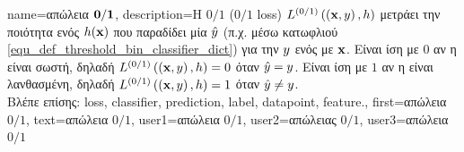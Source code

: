 
{name={\foreignlanguage{greek}{απώλεια} $\bf 0/1$},
	description={\foreignlanguage{greek}{H}  $0/1$ ($0/1$ loss)
		$L^{(0/1)}\left(\left( {\bf x},y \right),h \right)$ \foreignlanguage{greek}{μετράει την ποιότητα ενός} 
		 $h({\bf x})$ \foreignlanguage{greek}{που παραδίδει μία} 
		 $\hat{y}$ (\foreignlanguage{greek}{π.χ. μέσω κατω\-φλιού} \eqref{equ_def_threshold_bin_classifier_dict}) 
		\foreignlanguage{greek}{για την}  $y$ \foreignlanguage{greek}{ενός}  
		\foreignlanguage{greek}{με}  ${\bf x}$. \foreignlanguage{greek}{Εί\-ναι ίση με $0$ αν η} 
		 \foreignlanguage{greek}{είναι σωστή, δηλαδή 
		$L^{(0/1)}\left(\left( {\bf x},y \right),h \right)=0$ όταν $\hat{y}=y$. Είναι ίση με
		$1$ αν η}  \foreignlanguage{greek}{είναι λανθασμένη, δηλαδή $L^{(0/1)}\left(\left( {\bf x},y \right),h \right)=1$ 
		όταν} $\hat{y}\neq y$.
		\\
		\foreignlanguage{greek}{Βλέπε επίσης:} \gls{loss}, \gls{classifier}, \gls{prediction}, \gls{label}, \gls{datapoint}, \gls{feature}.},
    	first={\foreignlanguage{greek}{απώλεια $0/1$}},
    	text={\foreignlanguage{greek}{απώλεια $0/1$}},
    	user1={\foreignlanguage{greek}{απώλεια $0/1$}}, %
    	user2={\foreignlanguage{greek}{απώλειας $0/1$}}, %
    	user3={\foreignlanguage{greek}{απώλεια $0/1$}} %
}

